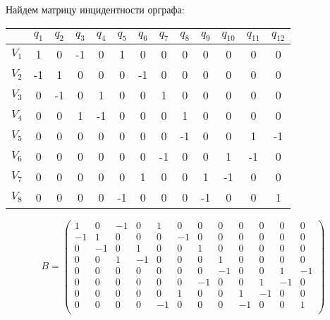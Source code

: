 \begin{enumerate}
   Найдем матрицу инцидентности орграфа:

   \begin{tabular}{|*{13}{c|}}
     \hline
      & $q_1$ & $q_2$ & $q_3$ & $q_4$ & $q_5$ & $q_6$ & $q_7$ & $q_8$ & $q_9$ & $q_{10}$ & $q_{11}$ & $q_{12}$ \\
      \hline
      $V_1$ & 1 & 0 & -1 & 0 & 1 & 0 & 0 & 0 & 0 & 0 & 0 & 0 \\
      \hline
      $V_2$ & -1 & 1 & 0 & 0 & 0 & -1 & 0 & 0 & 0 & 0 & 0 & 0 \\
      \hline
      $V_3$ & 0 & -1 & 0 & 1 & 0 & 0 & 1 & 0 & 0 & 0 & 0 & 0 \\
      \hline
      $V_4$ & 0 & 0 & 1 & -1 & 0 & 0 & 0 & 1 & 0 & 0 & 0 & 0 \\
      \hline
      $V_5$ & 0 & 0 & 0 & 0 & 0 & 0 & 0 & -1 & 0 & 0 & 1 & -1 \\
      \hline
      $V_6$ & 0 & 0 & 0 & 0 & 0 & 0 & -1 & 0 & 0 & 1 & -1 & 0 \\
      \hline
      $V_7$ & 0 & 0 & 0 & 0 & 0 & 1 & 0 & 0 & 1 & -1 & 0 & 0 \\
      \hline
      $V_8$ & 0 & 0 & 0 & 0 & -1 & 0 & 0 & 0 & -1 & 0 & 0 & 1 \\
      \hline
   \end{tabular}

   \vspace{\baselineskip}

   $$B=\left( \begin{array}{*{12}{c}}
   1 & 0 & -1 & 0 & 1 & 0 & 0 & 0 & 0 & 0 & 0 & 0 \\
   -1 & 1 & 0 & 0 & 0 & -1 & 0 & 0 & 0 & 0 & 0 & 0 \\
   0 & -1 & 0 & 1 & 0 & 0 & 1 & 0 & 0 & 0 & 0 & 0 \\
   0 & 0 & 1 & -1 & 0 & 0 & 0 & 1 & 0 & 0 & 0 & 0 \\
   0 & 0 & 0 & 0 & 0 & 0 & 0 & -1 & 0 & 0 & 1 & -1 \\
   0 & 0 & 0 & 0 & 0 & 0 & -1 & 0 & 0 & 1 & -1 & 0 \\
   0 & 0 & 0 & 0 & 0 & 1 & 0 & 0 & 1 & -1 & 0 & 0 \\
   0 & 0 & 0 & 0 & -1 & 0 & 0 & 0 & -1 & 0 & 0 & 1 \\
   \end{array} \right)$$


\end{enumerate}
